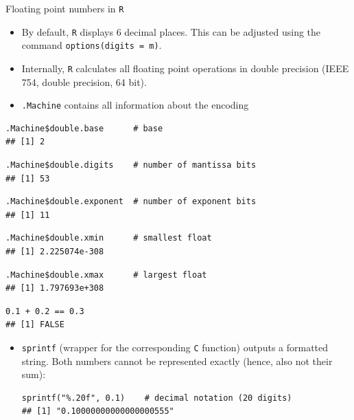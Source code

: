 \documentclass[11pt,compress,t,notes=noshow, xcolor=table]{beamer}
\begin{document}
\begin{vbframe}{Floating point numbers in \texttt{R}}

\begin{itemize}
\item By default, \texttt{R} displays $6$ decimal places. This can be adjusted using the command \texttt{options(digits = m)}.
\item Internally, \texttt{R} calculates all floating point operations in double precision (IEEE 754, double precision, 64 bit).
\item \texttt{.Machine} contains all information about the encoding
\end{itemize}

\framebreak
\lz
\begin{verbatim}
.Machine$double.base      # base
## [1] 2
\end{verbatim}

\vspace{0.3cm}
\begin{verbatim}
.Machine$double.digits    # number of mantissa bits
## [1] 53
\end{verbatim}

\vspace{0.3cm}
\begin{verbatim}
.Machine$double.exponent  # number of exponent bits
## [1] 11
\end{verbatim}

\vspace{0.3cm}
\begin{verbatim}
.Machine$double.xmin      # smallest float
## [1] 2.225074e-308
\end{verbatim}

\vspace{0.3cm}
\begin{verbatim}
.Machine$double.xmax      # largest float
## [1] 1.797693e+308
\end{verbatim}


\framebreak

\footnotesize
\begin{verbatim}
0.1 + 0.2 == 0.3
## [1] FALSE
\end{verbatim}

\vspace{0.3cm}
\normalsize
\begin{itemize}
\item \texttt{sprintf} (wrapper for the corresponding \texttt{C} function) outputs a formatted string. Both numbers cannot be represented exactly (hence, also not their sum):
\footnotesize
\vspace{0.2cm}
\begin{verbatim}
sprintf("%.20f", 0.1)    # decimal notation (20 digits)
## [1] "0.10000000000000000555"
\end{verbatim}


\end{itemize}
\end{vbframe}
\end{document}
